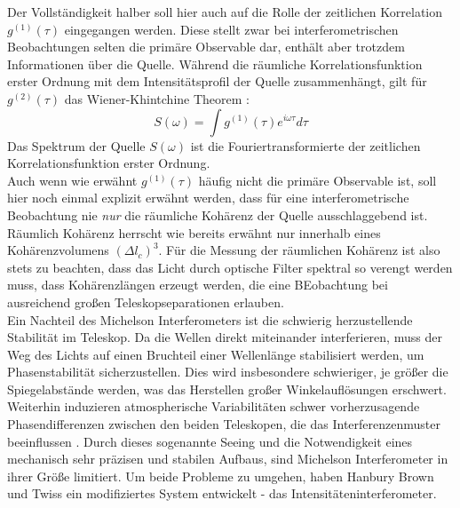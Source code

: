 Der Vollständigkeit halber soll hier auch auf die Rolle der zeitlichen Korrelation $g^{(1)}(\tau)$ eingegangen werden. 
Diese stellt zwar bei interferometrischen Beobachtungen selten die primäre Observable dar, enthält aber trotzdem Informationen über die Quelle. 
Während die räumliche Korrelationsfunktion erster Ordnung mit dem Intensitätsprofil der Quelle zusammenhängt, gilt für $g^{(2)}(\tau)$ das Wiener-Khintchine Theorem \cite{lasseguesFieldIntensityCorrelations2022}:
\begin{equation}
    S(\omega) =  \int g^{(1)}(\tau) e^{i\omega\tau} d\tau
\end{equation}
Das Spektrum der Quelle $S(\omega)$ ist die Fouriertransformierte der zeitlichen Korrelationsfunktion erster Ordnung. \\
Auch wenn wie erwähnt $g^{(1)}(\tau)$ häufig nicht die primäre Observable ist, soll hier noch einmal explizit erwähnt werden, dass für eine interferometrische Beobachtung nie \emph{nur} die räumliche Kohärenz der Quelle ausschlaggebend ist. 
Räumlich Kohärenz herrscht wie bereits erwähnt nur innerhalb eines Kohärenzvolumens $(\Delta l_c) ^3$. 
Für die Messung der räumlichen Kohärenz ist also stets zu beachten, dass das Licht durch optische Filter spektral so verengt werden muss, dass Kohärenzlängen erzeugt werden, die eine BEobachtung bei ausreichend großen Teleskopseparationen erlauben. \\

Ein Nachteil des Michelson Interferometers ist die schwierig herzustellende Stabilität im Teleskop. 
Da die Wellen direkt miteinander interferieren, muss der Weg des Lichts auf einen Bruchteil einer Wellenlänge stabilisiert werden, um Phasenstabilität sicherzustellen. 
Dies wird insbesondere schwieriger, je größer die Spiegelabstände werden, was das Herstellen großer Winkelauflösungen erschwert. 
Weiterhin induzieren atmospherische Variabilitäten schwer vorherzusagende Phasendifferenzen zwischen den beiden Teleskopen, die das Interferenzenmuster beeinflussen \cite[Kap. 2]{brownIntensityInterferometerIts1974}. 
Durch dieses sogenannte \glqq Seeing \grqq und die Notwendigkeit eines mechanisch sehr präzisen und stabilen Aufbaus, sind Michelson Interferometer in ihrer Größe limitiert. 
Um beide Probleme zu umgehen, haben Hanbury Brown und Twiss ein modifiziertes System entwickelt - das Intensitäteninterferometer.

